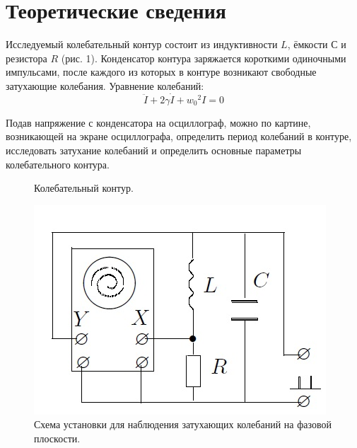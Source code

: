 \documentclass[a4paper,12pt]{article}
\begin{document}
\section{Теоретические сведения}
\par Исследуемый колебательный контур состоит из индуктивности $L$, ёмкости $С$ и резистора $R$ (рис. 1). Конденсатор контура заряжается короткими одиночными импульсами, после каждого из которых в контуре возникают свободные затухающие колебания. Уравнение колебаний:
\begin{equation}
{\ddot{I} + 2 \gamma \dot{I} + {w_0}^2 I = 0}
\end{equation}




\par Подав напряжение с конденсатора на осциллограф, можно по картине, возникающей на экране осциллографа, определить период колебаний в контуре, исследовать затухание колебаний и определить основные параметры колебательного контура.

\begin{figure}
	\caption{Колебательный контур.}
	\includegraphics[width=\linewidth]{S_K2}
	\caption{Схема установки для наблюдения затухающих колебаний на фазовой плоскости.}
	\label{mah}
	\vspace{-2cm}
\end{figure}
\end{document}
